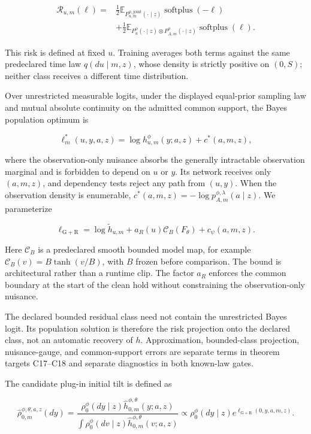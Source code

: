 \documentclass[11pt]{article}
\begin{document}
\[
\begin{aligned}
\mathcal R_{u,m}(\ell)
={}&\tfrac12
\mathbb E_{P_{u,m}^{\phi,\mathrm{joint}}(\cdot\mid z)}
\operatorname{softplus}(-\ell)\\
&+\tfrac12
\mathbb E_{P_u^\phi(\cdot\mid z)
\otimes P_{A,m}^\phi(\cdot\mid z)}
\operatorname{softplus}(\ell).
\end{aligned}
\]

This risk is defined at fixed \(u\). Training averages both terms against the same predeclared time law \(q(du\mid m,z)\), whose density is strictly positive on \((0,S)\); neither class receives a different time distribution.

Over unrestricted measurable logits, under the displayed equal-prior sampling law and mutual absolute continuity on the admitted common support, the Bayes population optimum is

\[
\ell_m^*(u,y,a,z)
=\log h_{u,m}^{\phi}(y;a,z)+c^*(a,m,z),
\]

where the observation-only nuisance absorbs the generally intractable observation marginal and is forbidden to depend on \(u\) or \(y\). Its network receives only \((a,m,z)\), and dependency tests reject any path from \((u,y)\). When the observation density is enumerable, \(c^*(a,m,z)=-\log p_{A,m}^{\phi,\lambda}(a\mid z)\). We parameterize

\[
\ell_{\mathrm{G+R}}
=\log\widetilde h_{u,m}
+a_R(u)\mathcal C_B(F_\theta)
+c_\psi(a,m,z).
\]

Here \(\mathcal C_B\) is a predeclared smooth bounded model map, for example \(\mathcal C_B(v)=B\tanh(v/B)\), with \(B\) frozen before comparison. The bound is architectural rather than a runtime clip. The factor \(a_R\) enforces the common boundary at the start of the clean hold without constraining the observation-only nuisance.

The declared bounded residual class need not contain the unrestricted Bayes logit. Its population solution is therefore the risk projection onto the declared class, not an automatic recovery of \(h\). Approximation, bounded-class projection, nuisance-gauge, and common-support errors are separate terms in theorem targets C17--C18 and separate diagnostics in both known-law gates.

The candidate plug-in initial tilt is defined as

\[
\widehat\rho_{0,m}^{\phi,\theta,a,z}(dy)
=\frac{\rho_0^\phi(dy\mid z)\widehat h_{0,m}^{\phi,\theta}(y;a,z)}
       {\int \rho_0^\phi(dv\mid z)
        \widehat h_{0,m}^{\phi,\theta}(v;a,z)}
\propto \rho_0^\phi(dy\mid z)
          e^{\ell_{\mathrm{G+R}}(0,y,a,m,z)}.
\]
\end{document}
